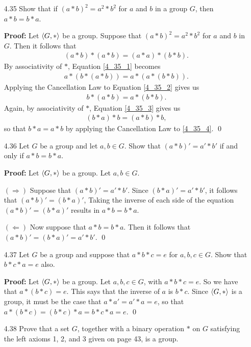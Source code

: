 \begin{enumerate}
   \item[4.35] Show that if $(a * b)^2 = a^2 * b^2$ for $a$ and $b$ in a group
               $G$, then $a * b = b * a$.

      \textbf{Proof:} Let $\langle G, * \rangle$ be a group. Suppose that
      $(a * b)^2 = a^2 * b^2$ for $a$ and $b$ in $G$. Then it follows that
      \begin{align}
         (a * b) * (a * b) = (a * a) * (b * b). \label{4_35_1}
      \end{align}
      By associativity of $*$, Equation \eqref{4_35_1} becomes
      \begin{align}
         a * (b * (a * b)) = a * (a * (b * b)). \label{4_35_2}
      \end{align}
      Applying the Cancellation Law to Equation \eqref{4_35_2} gives us
      \begin{align}
         b * (a * b) = a * (b * b). \label{4_35_3}
      \end{align}
      Again, by associativity of $*$, Equation \eqref{4_35_3} gives us
      \begin{align}
         (b * a) * b = (a * b) * b, \label{4_35_4}
      \end{align}
      so that $b * a = a * b$ by applying the Cancellation Law to
      \eqref{4_35_4}. \qed
   \item[4.36] Let $G$ be a group and let $a, b \in G$. Show that
               $(a * b)' = a' * b'$ if and only if $a * b = b * a$.

      \textbf{Proof:} Let $\langle G, * \rangle$ be a group. Let $a, b \in G$.

      $(\Rightarrow)$ Suppose that $(a * b)' = a' * b'$. Since
      $(b * a)' = a' * b'$, it follows that $(a * b)' = (b * a)'$, Taking the
      inverse of each side of the equation $(a * b)' = (b * a)'$ results in
      $a * b = b * a$.

      $(\Leftarrow)$ Now suppose that $a * b = b * a$. Then it follows that
      $(a * b)' = (b * a)' = a' * b'$. \qed
   \item[4.37] Let $G$ be a group and suppose that $a * b * c = e$ for
               $a, b, c \in G$. Show that $b * c * a = e$ also.

      \textbf{Proof:} Let $\langle G, * \rangle$ be a group. Let $a, b, c \in G$, with
      $a * b * c = e$. So we have that $a * (b * c) = e$. This says that the
      inverse of $a$ is $b * c$. Since $\langle G, * \rangle$ is a group, it must be the
      case that $a * a' = a' * a = e$, so that $a * (b * c) = (b * c) * a =
      b * c * a = e$. \qed
   \item[4.38] Prove that a set $G$, together with a binary operation $*$ on $G$
               satisfying the left axioms 1, 2, and 3 given on page 43, is a
               group.


\end{enumerate}
